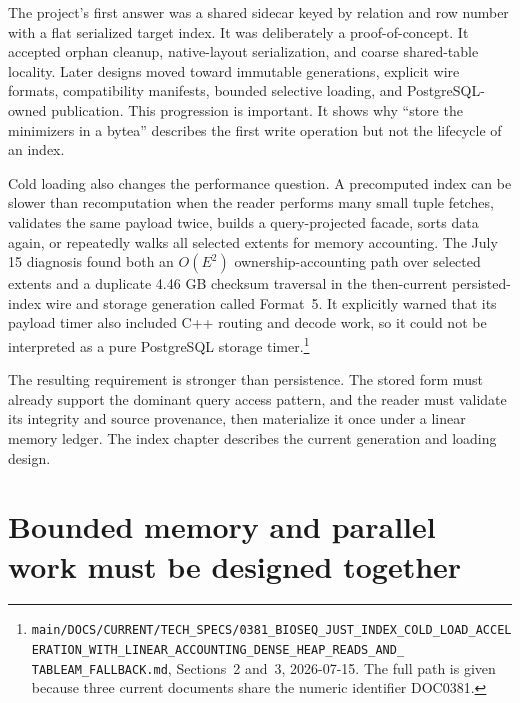 The project's first answer was a shared sidecar keyed by relation and row
number with a flat serialized target index.  It was deliberately a
proof-of-concept.  It accepted orphan cleanup, native-layout serialization,
and coarse shared-table locality.  Later designs moved toward immutable
generations, explicit wire formats, compatibility manifests, bounded
selective loading, and PostgreSQL-owned publication.  This progression is
important.  It shows why ``store the minimizers in a bytea'' describes the
first write operation but not the lifecycle of an index.

Cold loading also changes the performance question.  A precomputed index
can be slower than recomputation when the reader performs many small tuple
fetches, validates the same payload twice, builds a query-projected facade,
sorts data again, or repeatedly walks all selected extents for memory
accounting.  The July 15 diagnosis found both an
\(O(E^2)\) ownership-accounting path over selected extents and a duplicate
4.46 GB checksum traversal in the then-current persisted-index wire and
storage generation called Format~5.
It explicitly warned that its payload timer also included C++ routing and
decode work, so it could not be interpreted as a pure PostgreSQL storage
timer.\footnote{%
\texttt{main/DOCS/CURRENT/TECH\_SPECS/}\linebreak[4]%
\texttt{0381\_BIOSEQ\_JUST\_INDEX\_COLD\_LOAD\_}\linebreak[4]%
\texttt{ACCELERATION\_WITH\_LINEAR\_ACCOUNTING\_}\linebreak[4]%
\texttt{DENSE\_HEAP\_READS\_AND\_}\allowbreak%
\texttt{TABLEAM\_FALLBACK.md},
Sections~2 and~3, 2026-07-15.  The full path is given because three current
documents share the numeric identifier DOC0381.}

The resulting requirement is stronger than persistence.  The stored form
must already support the dominant query access pattern, and the reader
must validate its integrity and source provenance, then materialize it once
under a linear memory ledger.
The index chapter describes the current generation and loading design.

\section{Bounded memory and parallel work must be designed together}
\label{sec:resource-gap}


